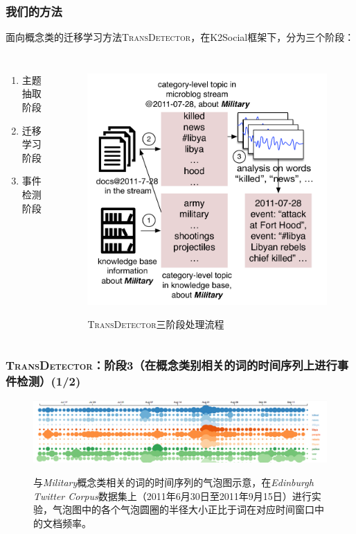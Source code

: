 \begin{frame}
\frametitle{我们的方法}
面向概念类的迁移学习方法\textsc{TransDetector}，在K2Social框架下，分为三个阶段：
\vspace{-6mm}
\begin{columns}[t]
\begin{enumerate}
	\item 主题抽取阶段 \\
	\item 迁移学习阶段 \\
	\item 事件检测阶段
\end{enumerate}

\begin{figure}[h]
		\setlength{\abovecaptionskip}{-4mm}
        \setlength{\belowcaptionskip}{0.cm}
        \centering
		\caption{\textsc{TransDetector}三阶段处理流程}
        \includegraphics[width=0.7\columnwidth]{img/NSDetectorExample.pdf}
        \label{fig:hood}
\end{figure}
\end{columns}

\end{frame}


\begin{frame}
\frametitle{\textsc{TransDetector}：阶段3（在概念类别相关的词的时间序列上进行事件检测）(1/2)}	
\begin{figure}[h]
		\setlength{\abovecaptionskip}{0.cm}
        \setlength{\belowcaptionskip}{0.cm}
        \centering
        \caption{与\textit{Military}概念类相关的词的时间序列的气泡图示意，在\textit{Edinburgh Twitter Corpus}数据集上（2011年6月30日至2011年9月15日）进行实验，气泡图中的各个气泡圆圈的半径大小正比于词在对应时间窗口中的文档频率。}
        \includegraphics[width=.99\columnwidth]{img/screenShot.png}
        \label{fig:hood}
\end{figure}
\end{frame}

